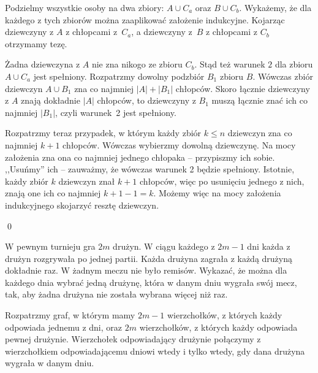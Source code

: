 \vspace{10px}
\noindent
Podzielmy wszystkie osoby na dwa zbiory: $A \cup C_a$ oraz $B \cup C_b$. Wykażemy, że dla każdego z tych zbiorów można zaaplikować założenie indukcyjne. Kojarząc dziewczyny z $A$ z chłopcami z~$C_a$, a dziewczyny z~$B$ z chłopcami z $C_b$ otrzymamy tezę.

\vspace{10px}
\noindent
Żadna dziewczyna z $A$ nie zna nikogo ze zbioru $C_b$. Stąd też warunek $2$ dla zbioru $A \cup C_a$ jest spełniony. Rozpatrzmy dowolny podzbiór $B_1$ zbioru $B$. Wówczas zbiór dziewczyn $A \cup B_1$ zna co najmniej $|A| + |B_1|$ chłopców. Skoro łącznie dziewczyny z $A$ znają dokładnie $|A|$ chłopców, to dziewczyny z $B_1$ muszą łącznie znać ich co najmniej $|B_1|$, czyli warunek~2 jest spełniony.

\vspace{10px}
\noindent
Rozpatrzmy teraz przypadek, w którym każdy zbiór $k \leqslant n$ dziewczyn zna co najmniej $k + 1$ chłopców. Wówczas wybierzmy dowolną dziewczynę. Na mocy założenia zna ona co najmniej jednego chłopaka -- przypiszmy ich sobie. ,,Usuńmy'' ich -- zauważmy, że wówczas warunek 2 będzie spełniony. Istotnie, każdy zbiór $k$ dziewczyn znał $k + 1$ chłopców, więc po usunięciu jednego z nich, znają one ich co najmniej $k + 1 - 1 = k$. Możemy więc na mocy założenia indukcyjnego skojarzyć resztę dziewczyn.

\qed

\newpage


\noindent
W pewnym turnieju gra $2m$ drużyn. W ciągu każdego z $2m - 1$ dni każda z drużyn rozgrywała po jednej partii. Każda drużyna zagrała z każdą drużyną dokładnie raz. W żadnym meczu nie było remisów. Wykazać, że można dla każdego dnia wybrać jedną drużynę, która w danym dniu wygrała swój mecz, tak, aby żadna drużyna nie została wybrana więcej niż raz.

\vspace{5px}


\vspace{5px}
\noindent
Rozpatrzmy graf, w którym mamy $2m - 1$ wierzchołków, z których każdy odpowiada jednemu z dni, oraz $2m$ wierzchołków, z których każdy odpowiada pewnej drużynie. Wierzchołek odpowiadający drużynie połączymy z wierzchołkiem odpowiadającemu dniowi wtedy i tylko wtedy, gdy dana drużyna wygrała w danym dniu.

